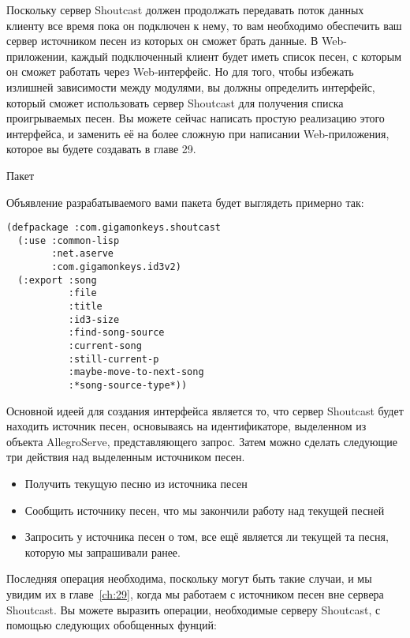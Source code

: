 Поскольку сервер Shoutcast должен продолжать передавать поток данных клиенту все время
пока он подключен к нему, то вам необходимо обеспечить ваш сервер источником песен из
которых он сможет брать данные.  В Web-приложении, каждый подключенный клиент будет иметь
список песен, с которым он сможет работать через Web-интерфейс.  Но для того, чтобы
избежать излишней зависимости между модулями, вы должны определить интерфейс, который
сможет использовать сервер Shoutcast для получения списка проигрываемых песен. Вы можете
сейчас написать простую реализацию этого интерфейса, и заменить её на более сложную при
написании Web-приложения, которое вы будете создавать в главе 29.


Пакет

Объявление разрабатываемого вами пакета будет выглядеть примерно так:

\begin{lstlisting}
(defpackage :com.gigamonkeys.shoutcast
  (:use :common-lisp 
        :net.aserve 
        :com.gigamonkeys.id3v2)
  (:export :song
           :file
           :title
           :id3-size
           :find-song-source
           :current-song
           :still-current-p
           :maybe-move-to-next-song
           :*song-source-type*))
\end{lstlisting}


Основной идеей для создания интерфейса является то, что сервер Shoutcast будет находить
источник песен, основываясь на идентификаторе, выделенном из объекта AllegroServe,
представляющего запрос.  Затем можно сделать следующие три действия над выделенным
источником песен.

\begin{itemize}
\item Получить текущую песню из источника песен
\item Сообщить источнику песен, что мы закончили работу над текущей песней
\item Запросить у источника песен о том, все ещё является ли текущей та песня, которую мы
  запрашивали ранее.
\end{itemize}

Последняя операция необходима, поскольку могут быть такие случаи, и мы увидим их в
главе~\ref{ch:29}, когда мы работаем с источником песен вне сервера Shoutcast.  Вы можете
выразить операции, необходимые серверу Shoutcast, с помощью следующих обобщенных фунций:

